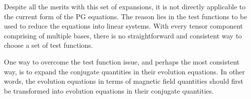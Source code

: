 Despite all the merits with this set of expansions, it is not directly applicable to the current form of the PG equations. 
The reason lies in the test functions to be used to reduce the equations into linear systems.
With every tensor component comprising of multiple bases, there is no straightforward and consistent way to choose a set of test functions.

One way to overcome the test function issue, and perhaps the most consistent way, is to expand the conjugate quantities in their evolution equations.
In other words, the evolution equations in terms of magnetic field quantities should first be transformed into evolution equations in their conjugate quantities.
